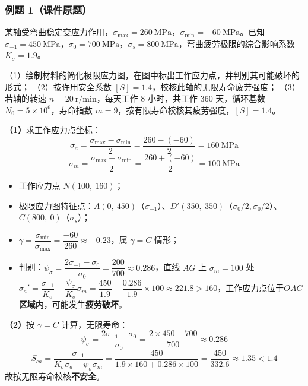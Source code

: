 \subsubsection{例题 1（课件原题）}

\begin{longexample}[单向稳定变应力疲劳强度校核]
\label{ex:单向疲劳校核}
某轴受弯曲稳定变应力作用，$\sigma_{\max}=260\ \mathrm{MPa}$，$\sigma_{\min}=-60\ \mathrm{MPa}$。已知 $\sigma_{-1}=450\ \mathrm{MPa}$，$\sigma_0=700\ \mathrm{MPa}$，$\sigma_s=800\ \mathrm{MPa}$，弯曲疲劳极限的综合影响系数 $K_\sigma=1.9$。

（1）绘制材料的简化极限应力图，在图中标出工作应力点，并判别其可能破坏的形式；
（2）按许用安全系数 $[S]=1.4$，校核此轴的无限寿命疲劳强度；
（3）若轴的转速 $n=20\ \mathrm{r/min}$，每天工作 8 小时，共工作 360 天，循环基数 $N_0=5\times10^6$，寿命指数 $m=9$，按有限寿命校核其疲劳强度，$[S]=1.4$。

\begin{solution}
\textbf{（1）}求工作应力点坐标：
\begin{equation}
	\sigma_a=\frac{\sigma_{\max}-\sigma_{\min}}{2}=\frac{260-(-60)}{2}=160\ \mathrm{MPa}
	\label{eq:强度:例1应力幅}
\end{equation}
\begin{equation}
	\sigma_m=\frac{\sigma_{\max}+\sigma_{\min}}{2}=\frac{260+(-60)}{2}=100\ \mathrm{MPa}
	\label{eq:强度:例1平均应力}
\end{equation}
\begin{itemize}
	\item 工作应力点 $N(100,\ 160)$；
	\item 极限应力图特征点：$A(0,\ 450)$（$\sigma_{-1}$）、$D'(350,\ 350)$（$\sigma_0/2,\sigma_0/2$）、$C(800,\ 0)$（$\sigma_s$）；
	\item $\gamma=\dfrac{\sigma_{\min}}{\sigma_{\max}}=\dfrac{-60}{260}\approx-0.23$，属 $\gamma=C$ 情形；
	\item 判别：$\psi_\sigma=\dfrac{2\sigma_{-1}-\sigma_0}{\sigma_0}=\dfrac{200}{700}\approx0.286$，直线 $AG$ 上 $\sigma_m=100$ 处 $\sigma_a'=\dfrac{\sigma_{-1}}{K_\sigma}-\dfrac{\psi_\sigma}{K_\sigma}\sigma_m=\dfrac{450}{1.9}-\dfrac{0.286}{1.9}\times100\approx221.8>160$，工作应力点位于\textbf{$OAG$ 区域内}，可能发生\textbf{疲劳破坏}。
\end{itemize}

\textbf{（2）}按 $\gamma=C$ 计算，无限寿命：
\begin{equation}
	\psi_\sigma=\frac{2\sigma_{-1}-\sigma_0}{\sigma_0}=\frac{2\times450-700}{700}\approx0.286
	\label{eq:强度:例1psi}
\end{equation}
\begin{equation}
	S_{ca}=\frac{\sigma_{-1}}{K_\sigma\sigma_a+\psi_\sigma\sigma_m}=\frac{450}{1.9\times160+0.286\times100}=\frac{450}{332.6}\approx1.35<1.4
	\label{eq:强度:例1无限寿命}
\end{equation}
故按无限寿命校核\textbf{不安全}。


\end{solution}
\end{longexample}
